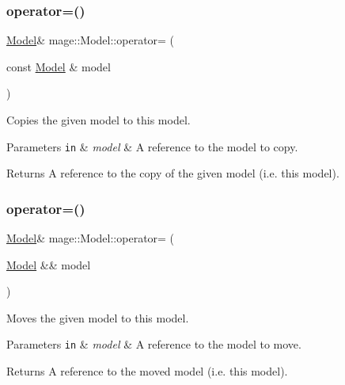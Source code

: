 \subsubsection{\texorpdfstring{operator=()}{operator=()}\hspace{0.1cm}{\footnotesize\ttfamily [1/2]}}
{\footnotesize\ttfamily \hyperlink{classmage_1_1_model}{Model}\& mage\+::\+Model\+::operator= (\begin{DoxyParamCaption}\item[{const \hyperlink{classmage_1_1_model}{Model} \&}]{model }\end{DoxyParamCaption})\hspace{0.3cm}{\ttfamily [delete]}}

Copies the given model to this model.


\begin{DoxyParams}[1]{Parameters}
\mbox{\tt in}  & {\em model} & A reference to the model to copy. \\
\hline
\end{DoxyParams}
\begin{DoxyReturn}{Returns}
A reference to the copy of the given model (i.\+e. this model). 
\end{DoxyReturn}
\hypertarget{classmage_1_1_model_a084e30d15822bfefa79128f30a57cc02}{}\label{classmage_1_1_model_a084e30d15822bfefa79128f30a57cc02} 
\subsubsection{\texorpdfstring{operator=()}{operator=()}\hspace{0.1cm}{\footnotesize\ttfamily [2/2]}}
{\footnotesize\ttfamily \hyperlink{classmage_1_1_model}{Model}\& mage\+::\+Model\+::operator= (\begin{DoxyParamCaption}\item[{\hyperlink{classmage_1_1_model}{Model} \&\&}]{model }\end{DoxyParamCaption})\hspace{0.3cm}{\ttfamily [delete]}}

Moves the given model to this model.


\begin{DoxyParams}[1]{Parameters}
\mbox{\tt in}  & {\em model} & A reference to the model to move. \\
\hline
\end{DoxyParams}
\begin{DoxyReturn}{Returns}
A reference to the moved model (i.\+e. this model). 
\end{DoxyReturn}
\hypertarget{classmage_1_1_model_aabcd12eeab9d6b81e27c727cb94cf57a}{}\label{classmage_1_1_model_aabcd12eeab9d6b81e27c727cb94cf57a} 

